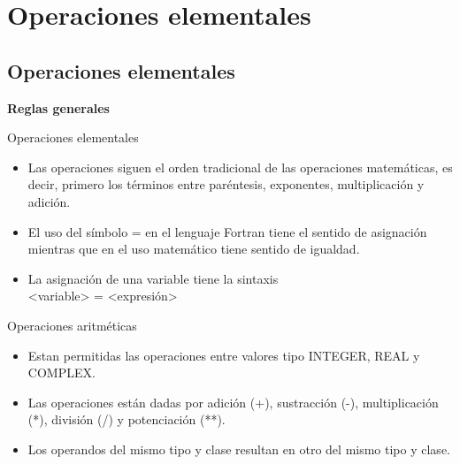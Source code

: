 
\section{Operaciones elementales}  


\subsection{Operaciones elementales}
\textbf{Reglas generales}
\begin{frame}[fragile]{Operaciones elementales}
 \begin{itemize}[<+(0)->]
  \item Las operaciones siguen el orden tradicional de las operaciones matemáticas, es decir, primero los términos entre paréntesis, exponentes, multiplicación y adición.
  \item El uso del símbolo = en el lenguaje Fortran tiene el sentido de asignación mientras que en el uso matemático tiene sentido de igualdad. 
  \item La asignación de una variable tiene la sintaxis \\
      \centering <variable> = <expresión>\\
 \end{itemize}
\end{frame}

\begin{frame}[fragile]{Operaciones aritméticas}
 \begin{itemize}[<+(0)->]
  \item Estan permitidas las operaciones entre valores tipo INTEGER, REAL y COMPLEX.
  \item Las operaciones están dadas por adición (+), sustracción (-), multiplicación (*), división (/) y potenciación (**).
  \item Los operandos del mismo tipo y clase resultan en otro del mismo tipo y clase.
 \end{itemize}
\end{frame}


